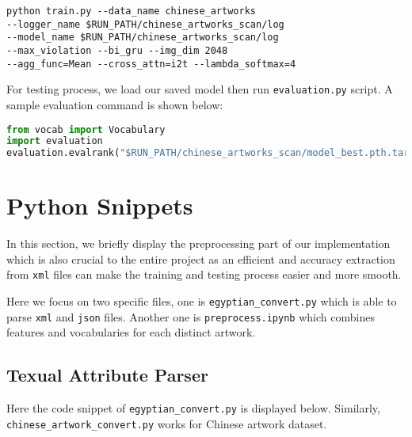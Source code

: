 \begin{lstlisting}
python train.py --data_name chinese_artworks 
--logger_name $RUN_PATH/chinese_artworks_scan/log 
--model_name $RUN_PATH/chinese_artworks_scan/log 
--max_violation --bi_gru --img_dim 2048
--agg_func=Mean --cross_attn=i2t --lambda_softmax=4
\end{lstlisting}

For testing process, we load our saved model then run \verb|evaluation.py| script. A sample evaluation command is shown below:

\begin{lstlisting}[language=python]
from vocab import Vocabulary
import evaluation
evaluation.evalrank("$RUN_PATH/chinese_artworks_scan/model_best.pth.tar", data_path="$DATA_PATH", split="test")
\end{lstlisting}



\section{Python Snippets}
In this section, we briefly display the preprocessing part of our implementation which is also crucial to the entire project as an efficient and accuracy extraction from \verb|xml| files can make the training and testing process easier and more smooth.

Here we focus on two specific files, one is \verb|egyptian_convert.py| which is able to parse \verb|xml| and \verb|json| files. Another one is \verb|preprocess.ipynb| which combines features and vocabularies for each distinct artwork.


\subsection{Texual Attribute Parser}

Here the code snippet of \verb|egyptian_convert.py| is displayed below. Similarly, \verb|chinese_artwork_convert.py| works for Chinese artwork dataset.

